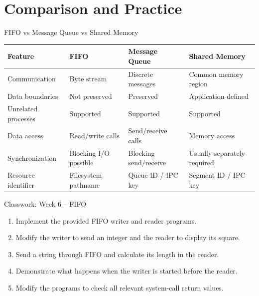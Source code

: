 \documentclass[aspectratio=169,10pt]{beamer}
\begin{document}
\section{Comparison and Practice}

\begin{frame}{FIFO vs Message Queue vs Shared Memory}

\scriptsize

\begin{center}
\begin{tabular}{p{2.4cm}p{3.2cm}p{3.2cm}p{3.2cm}}
\toprule
\textbf{Feature} &
\textbf{FIFO} &
\textbf{Message Queue} &
\textbf{Shared Memory}\\
\midrule

Communication &
Byte stream &
Discrete messages &
Common memory region\\
\addlinespace

Data boundaries &
Not preserved &
Preserved &
Application-defined\\
\addlinespace

Unrelated processes &
Supported &
Supported &
Supported\\
\addlinespace

Data access &
Read/write calls &
Send/receive calls &
Memory access\\
\addlinespace

Synchronization &
Blocking I/O possible &
Blocking send/receive &
Usually separately required\\
\addlinespace

Resource identifier &
Filesystem pathname &
Queue ID / IPC key &
Segment ID / IPC key\\
\bottomrule
\end{tabular}
\end{center}

\end{frame}

\begin{frame}{Classwork: Week 6 -- FIFO}

\begin{enumerate}
    \item Implement the provided FIFO writer
    and reader programs.

    \item Modify the writer to send an integer
    and the reader to display its square.

    \item Send a string through FIFO and
    calculate its length in the reader.

    \item Demonstrate what happens when
    the writer is started before the reader.

    \item Modify the programs to check
    all relevant system-call return values.
\end{enumerate}

\end{frame}
\end{document}
